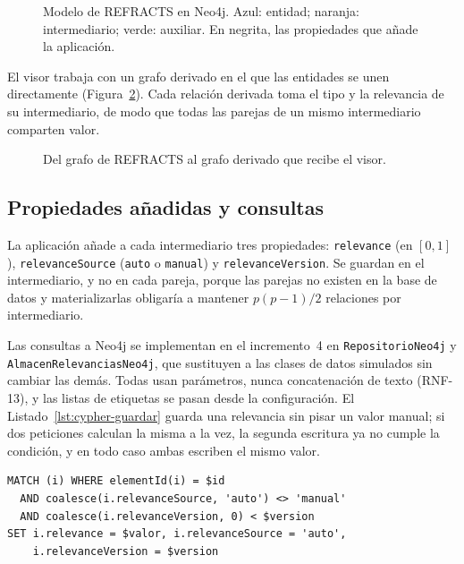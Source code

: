 \begin{figure}
  \centering
  \caption{Modelo de REFRACTS en Neo4j. Azul: entidad; naranja: intermediario; verde: auxiliar. En negrita, las propiedades que añade la aplicación.}
  \label{fig:bd-refracts}
\end{figure}

El visor trabaja con un grafo derivado en el que las entidades se unen directamente (Figura~\ref{fig:bd-derivacion}). Cada relación derivada toma el tipo y la relevancia de su intermediario, de modo que todas las parejas de un mismo intermediario comparten valor.

\begin{figure}[htbp]
  \centering
  \caption{Del grafo de REFRACTS al grafo derivado que recibe el visor.}
  \label{fig:bd-derivacion}
\end{figure}

\subsection{Propiedades añadidas y consultas}

La aplicación añade a cada intermediario tres propiedades: \texttt{relevance} (en $[0,1]$), \texttt{relevanceSource} (\texttt{auto} o \texttt{manual}) y \texttt{relevanceVersion}. Se guardan en el intermediario, y no en cada pareja, porque las parejas no existen en la base de datos y materializarlas obligaría a mantener $p(p-1)/2$ relaciones por intermediario.

Las consultas a Neo4j se implementan en el incremento~4 en \texttt{RepositorioNeo4j} y \texttt{AlmacenRelevanciasNeo4j}, que sustituyen a las clases de datos simulados sin cambiar las demás. Todas usan parámetros, nunca concatenación de texto (RNF-13), y las listas de etiquetas se pasan desde la configuración. El Listado~\ref{lst:cypher-guardar} guarda una relevancia sin pisar un valor manual; si dos peticiones calculan la misma a la vez, la segunda escritura ya no cumple la condición, y en todo caso ambas escriben el mismo valor.

\begin{lstlisting}[style=codigo, caption={Consulta prevista para guardar una relevancia.}, label={lst:cypher-guardar}]
MATCH (i) WHERE elementId(i) = $id
  AND coalesce(i.relevanceSource, 'auto') <> 'manual'
  AND coalesce(i.relevanceVersion, 0) < $version
SET i.relevance = $valor, i.relevanceSource = 'auto',
    i.relevanceVersion = $version
\end{lstlisting}

